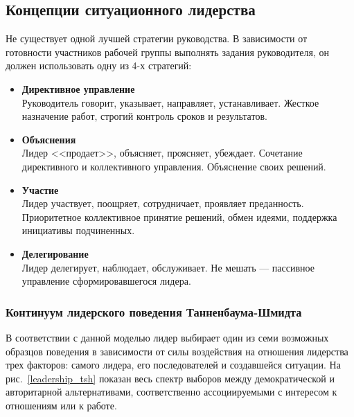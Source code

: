 \documentclass[a4paper,12pt,oneside,final]{extarticle}
\numberwithin{equation}{section}
\begin{document}
\subsection{Концепции ситуационного лидерства}
Не существует одной лучшей стратегии руководства. 
В зависимости от готовности участников рабочей группы выполнять задания руководителя, он должен использовать одну из 4-х стратегий:
\begin{itemize}
	\item \textbf{Директивное управление} \\
	Руководитель говорит, указывает, направляет, устанавливает. 
	Жесткое назначение работ, строгий контроль сроков и результатов.
	\item \textbf{Объяснения} \\
	Лидер <<продает>>, объясняет, проясняет, убеждает. 
	Сочетание директивного и коллективного управления. 
	Объяснение своих решений.
	\item \textbf{Участие} \\
	Лидер участвует, поощряет, сотрудничает, проявляет преданность. 
	Приоритетное коллективное принятие решений, обмен идеями, поддержка инициативы подчиненных.
	\item \textbf{Делегирование} \\ 
	Лидер делегирует, наблюдает, обслуживает. 
	Не мешать --- пассивное управление сформировавшегося лидера.
\end{itemize}

\subsubsection{Континуум лидерского поведения Танненбаума-Шмидта}
В соответствии с данной моделью лидер выбирает один из семи возможных образцов поведения в зависимости от силы воздействия на отношения лидерства трех факторов: самого лидера, его последователей и создавшейся ситуации. 
На рис.~\ref{leadership_tsh} показан весь спектр выборов между демократической и авторитарной альтернативами, соответственно ассоциируемыми с интересом к отношениям или к работе.
\end{document}
